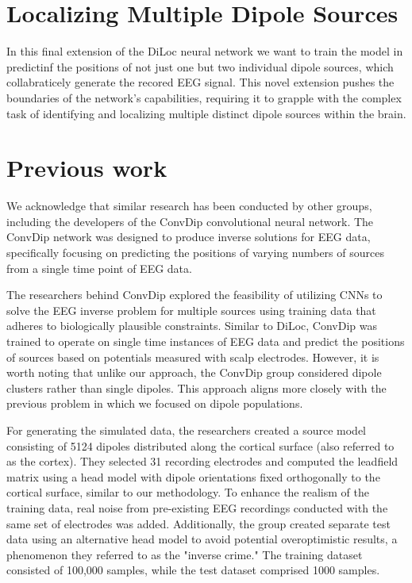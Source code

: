 \documentclass[a4paper, UKenglish, 11pt]{uiomaster}
\begin{document}
\section{Localizing Multiple Dipole Sources}
In this final extension of the DiLoc neural network we want to train the model in predictinf the positions of not just one but two individual dipole sources, which collabraticely generate the recored EEG signal. This novel extension pushes the boundaries of the network's capabilities, requiring it to grapple with the complex task of identifying and localizing multiple distinct dipole sources within the brain.

\section{Previous work}
We acknowledge that similar research has been conducted by other groups, including the developers of the ConvDip convolutional neural network. The ConvDip network was designed to produce inverse solutions for EEG data, specifically focusing on predicting the positions of varying numbers of sources from a single time point of EEG data.

The researchers behind ConvDip explored the feasibility of utilizing CNNs to solve the EEG inverse problem for multiple sources using training data that adheres to biologically plausible constraints. Similar to DiLoc, ConvDip was trained to operate on single time instances of EEG data and predict the positions of sources based on potentials measured with scalp electrodes. However, it is worth noting that unlike our approach, the ConvDip group considered dipole clusters rather than single dipoles. This approach aligns more closely with the previous problem in which we focused on dipole populations.

For generating the simulated data, the researchers created a source model consisting of 5124 dipoles distributed along the cortical surface (also referred to as the cortex). They selected 31 recording electrodes and computed the leadfield matrix using a head model with dipole orientations fixed orthogonally to the cortical surface, similar to our methodology. To enhance the realism of the training data, real noise from pre-existing EEG recordings conducted with the same set of electrodes was added. Additionally, the group created separate test data using an alternative head model to avoid potential overoptimistic results, a phenomenon they referred to as the "inverse crime." The training dataset consisted of 100,000 samples, while the test dataset comprised 1000 samples.
\end{document}
